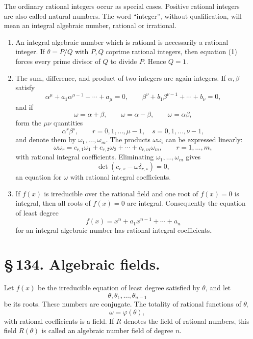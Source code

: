 \documentclass[11pt]{article}
\begin{document}
The ordinary rational integers occur as special cases. Positive
rational integers are also called natural numbers. The word
``integer'', without qualification, will mean an integral algebraic
number, rational or irrational.

\begin{enumerate}[label=\arabic*.]
\item An integral algebraic number which is rational is necessarily a
rational integer. If \(\theta=P/Q\) with \(P,Q\) coprime rational
integers, then equation (1) forces every prime divisor of \(Q\) to
divide \(P\). Hence \(Q=1\).

\item The sum, difference, and product of two integers are again
integers. If \(\alpha,\beta\) satisfy
\[
\alpha^\mu+a_1\alpha^{\mu-1}+\cdots+a_\mu=0,\qquad
\beta^\nu+b_1\beta^{\nu-1}+\cdots+b_\nu=0,
\]
and if
\[
\omega=\alpha+\beta,\qquad \omega=\alpha-\beta,\qquad
\omega=\alpha\beta,
\]
form the \(\mu\nu\) quantities
\[
\alpha^r\beta^s,\qquad r=0,1,\ldots,\mu-1,\quad
s=0,1,\ldots,\nu-1,
\]
and denote them by \(\omega_1,\ldots,\omega_m\). The products
\(\omega\omega_i\) can be expressed linearly:
\begin{equation}
\omega\omega_r=c_{r,1}\omega_1+c_{r,2}\omega_2+\cdots+c_{r,m}\omega_m,
\qquad r=1,\ldots,m,
\tag{2}
\end{equation}
with rational integral coefficients. Eliminating
\(\omega_1,\ldots,\omega_m\) gives
\begin{equation}
\det(c_{r,s}-\omega\delta_{r,s})=0,
\tag{3}
\end{equation}
an equation for \(\omega\) with rational integral coefficients.

\item If \(f(x)\) is irreducible over the rational field and one root
of \(f(x)=0\) is integral, then all roots of \(f(x)=0\) are integral.
Consequently the equation of least degree
\begin{equation}
f(x)=x^n+a_1x^{n-1}+\cdots+a_n
\tag{4}
\end{equation}
for an integral algebraic number has rational integral coefficients.
\end{enumerate}

\section*{\S\,134. Algebraic fields.}

Let \(f(x)\) be the irreducible equation of least degree satisfied by
\(\theta\), and let
\[
\theta,\theta_1,\ldots,\theta_{n-1}
\]
be its roots. These numbers are conjugate. The totality of rational
functions of \(\theta\),
\[
\omega=\varphi(\theta),
\]
with rational coefficients is a field. If \(R\) denotes the field of
rational numbers, this field \(R(\theta)\) is called an algebraic
number field of degree \(n\).
\end{document}
